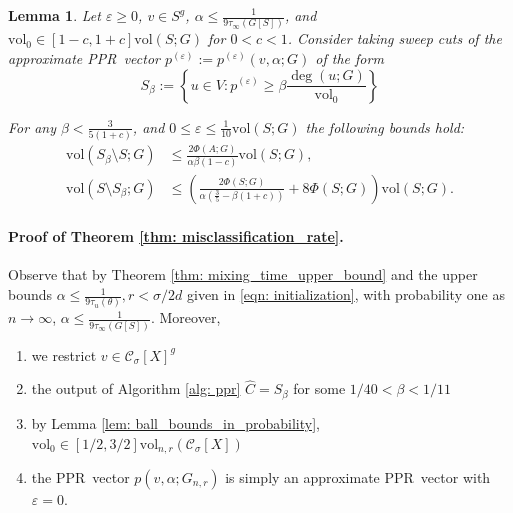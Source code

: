 \documentclass[11pt,twoside]{article}
\newtheorem{lemma}{Lemma}
\newcommand{\vol}{\mathrm{vol}}
\newcommand{\1}{\mathbf{1}}
\newcommand{\pbf}{p}        %
\newcommand{\Xbf}{X}             %
\newcommand{\Cset}{\mathcal{C}}
\newcommand{\Csig}{\Cset_{\sigma}}
\newcommand{\pprspace}{{\sc PPR~}}
\begin{document}
\begin{lemma}
	\label{lem: zhu}
	Let $\varepsilon \geq 0$, $v \in S^g$, $\alpha \leq \frac{1}{9\tau_{\infty}(G[S])}$, and $\vol_0 \in [1 - c,1 + c] \vol(S;G)$ for $0 < c < 1$. Consider taking sweep cuts of the approximate \pprspace vector $\pbf^{(\varepsilon)} := \pbf^{(\varepsilon)}(v,\alpha; G)$ of the form
	\begin{equation*}
	S_{\beta} := \left\{u \in V: \pbf^{(\varepsilon)} \geq \beta \frac{\deg(u; G)}{\vol_0} \right\}
	\end{equation*}
	
	For any $\beta < \frac{3}{5(1 + c)}$, and $0 \leq \varepsilon \leq \frac{1}{10} \vol(S;G)$ the following bounds hold:
	\begin{align}
	\vol(S_{\beta} \setminus S; G) & \leq \frac{2\Phi(A;G)}{\alpha \beta(1 - c)} \vol(S; G), \label{eqn: zhu_1}\\
	\vol(S \setminus S_{\beta}; G) & \leq \left(\frac{2\Phi(S;G)}{\alpha (\frac{3}{5} - \beta(1 + c))} + 8\Phi(S;G)\right)\vol(S; G).  \label{eqn: zhu_2}
	\end{align}
\end{lemma}

\paragraph{Proof of Theorem \ref{thm: misclassification_rate}.}

Observe that by Theorem \ref{thm: mixing_time_upper_bound} and the upper bounds $\alpha \leq \frac{1}{9 \tau_u(\theta)}, r < \sigma/2d$ given in \eqref{eqn: initialization}, with probability one as $n \to \infty$, $\alpha \leq \frac{1}{9\tau_{\infty}(G[S])}$. Moreover, 
\begin{enumerate}[\text{(i)}]
	\item we restrict $v \in \Csig[\Xbf]^g$
	\item the output of Algorithm \ref{alg: ppr} $\widehat{C} = S_{\beta}$ for some $1/40 < \beta < 1/11$
	\item by Lemma \ref{lem: ball_bounds_in_probability}, $\vol_0 \in [1/2,3/2]\vol_{n,r}(\Csig[\Xbf])$
	\item the \pprspace vector $\pbf(v,\alpha;G_{n,r})$ is simply an approximate \pprspace vector with $\varepsilon = 0$.
\end{enumerate}
\end{document}
